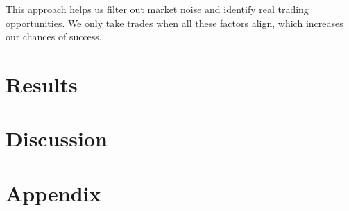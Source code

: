 \documentclass[12pt]{article}
\begin{document}
This approach helps us filter out market noise and identify real trading opportunities. We only take trades when all these factors align, which increases our chances of success.





\newpage
\section{Results}

\newpage
\section{Discussion}


\newpage
\section{Appendix}
\end{document}
